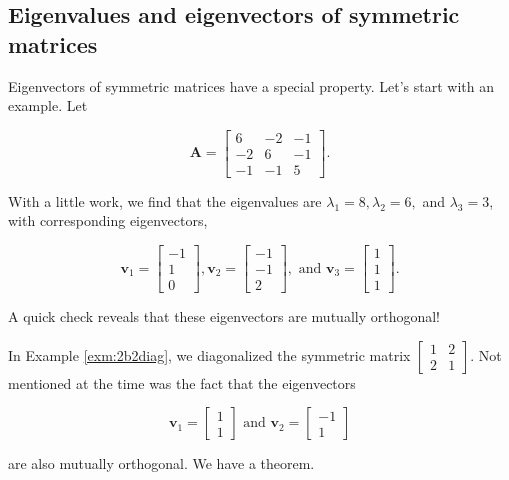 \documentclass[
]{book}
\theoremstyle{definition}
\theoremstyle{definition}
\theoremstyle{definition}
\theoremstyle{definition}
\theoremstyle{remark}
\begin{document}
\subsection*{Eigenvalues and eigenvectors of symmetric matrices}\label{eigenvalues-and-eigenvectors-of-symmetric-matrices}

Eigenvectors of symmetric matrices have a special property. Let's start with an example. Let

\[\mathbf{A}=\left[\begin{array}{rrr}6 & -2 & -1\\-2 & 6 & -1\\-1 & -1 & 5\end{array}\right].\]

With a little work, we find that the eigenvalues are \(\lambda_1=8,\lambda_2=6,\) and \(\lambda_3=3\), with corresponding eigenvectors,

\[\mathbf{v}_1=\left[\begin{array}{r}-1\\1\\0\end{array}\right],\mathbf{v}_2=\left[\begin{array}{r}-1\\-1\\2\end{array}\right], \text{ and } \mathbf{v}_3=\begin{bmatrix}1\\1\\1\end{bmatrix}.\]

A quick check reveals that these eigenvectors are mutually orthogonal!

In Example \ref{exm:2b2diag}, we diagonalized the symmetric matrix \(\begin{bmatrix}1 & 2\\2&1\end{bmatrix}.\) Not mentioned at the time was the fact that the eigenvectors

\[\mathbf{v}_1=\begin{bmatrix}1\\1\end{bmatrix} \text{ and } \mathbf{v}_2=\begin{bmatrix}-1\\1\end{bmatrix}\]

are also mutually orthogonal. We have a theorem.
\end{document}
